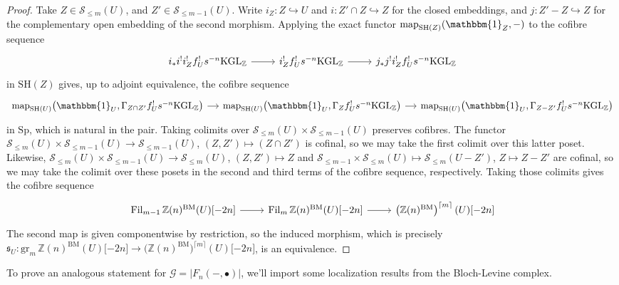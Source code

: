 \documentclass[11pt, twoside]{article}
\numberwithin{equation}{section}
\theoremstyle{definition}
\newcommand{\bb}[1]{\mathbb{#1}}
\newcommand{\mf}[1]{\mathfrak{#1}}
\newcommand{\map}{\mathrm{map}}
\newcommand{\fil}{\mathrm{Fil}}
\newcommand{\gr}{\mathrm{gr}}
\newcommand{\Kgl}{\mathrm{KGL}}
\newcommand{\sh}{\mathrm{SH}}
\newcommand{\Sp}{\mathrm{Sp}}
\newcommand{\bm}{\mathrm{BM}}
\begin{document}
\begin{proof}
Take \(Z \in \mathcal{S}_{\leq m}(U)\), and \(Z' \in \mathcal{S}_{\leq m - 1}(U)\). Write \(i_Z \colon Z \hookrightarrow U\) and \(i \colon Z' \cap Z\hookrightarrow Z\) for the closed embeddings, and \(j \colon Z' - Z \hookrightarrow Z\) for the complementary open embedding of the second morphism. Applying the exact functor \(\map_{\sh(Z)}(\mathbbm{1}_Z, -)\) to the cofibre sequence 
\[\begin{tikzcd}
i_* i^! i_Z^! f_U^! s^{- n} \Kgl_\bb{Z} \ar[r] & i_Z^! f_U^! s^{- n} \Kgl_\bb{Z} \ar[r] & j_*j^! i_Z^! f_U^! s^{- n} \Kgl_\bb{Z}
\end{tikzcd}\]
in \(\sh(Z)\) gives, up to adjoint equivalence, the cofibre sequence 
\[\begin{tikzcd} [column sep = small]
\map_{\sh(U)}\big(\mathbbm{1}_U, \Gamma_{Z \cap Z'} f_U^! s^{- n} \Kgl_\bb{Z}\big) \ar[r] & \map_{\sh(U)}\big(\mathbbm{1}_U, \Gamma_Z f_U^! s^{- n} \Kgl_\bb{Z}\big) \ar[r] & \map_{\sh(U)}\big(\mathbbm{1}_U, \Gamma_{Z - Z'} f_U^! s^{- n} \Kgl_\bb{Z}\big)
\end{tikzcd}\]
in \(\Sp\), which is natural in the pair. Taking colimits over \(\mathcal{S}_{\leq m}(U) \times \mathcal{S}_{\leq m - 1}(U)\) preserves cofibres. The functor \(\mathcal{S}_{\leq m}(U) \times \mathcal{S}_{\leq m - 1}(U) \to \mathcal{S}_{\leq m - 1}(U)\), \((Z, Z') \mapsto (Z \cap Z')\) is cofinal, so we may take the first colimit over this latter poset. Likewise, \(\mathcal{S}_{\leq m}(U) \times \mathcal{S}_{\leq m - 1}(U) \to \mathcal{S}_{\leq m}(U)\), \((Z, Z') \mapsto Z\) and \(\mathcal{S}_{\leq m - 1} \times \mathcal{S}_{\leq m}(U) \mapsto \mathcal{S}_{\leq m}(U - Z')\), \(Z \mapsto Z - Z'\) are cofinal, so we may take the colimit over these posets in the second and third terms of the cofibre sequence, respectively. Taking those colimits gives the cofibre sequence 
\[\begin{tikzcd} 
\fil_{m - 1} \, \bb{Z}(n)^\bm(U) \lbrack -2n \rbrack \ar[r] & \fil_m \, \bb{Z}(n)^\bm(U) \lbrack -2n \rbrack \ar[r] & \left(\bb{Z}(n)^\bm\right)^{\lceil m \rceil}(U)\lbrack -2n \rbrack
\end{tikzcd}\]
The second map is given componentwise by restriction, so the induced morphism, which is precisely \(\mf{s}_U \colon \gr_m \, \bb{Z}(n)^\bm(U) \lbrack -2n \rbrack \to \big(\bb{Z}(n)^\bm\big)^{\lceil m \rceil}(U)\lbrack -2n \rbrack\), is an equivalence.
\end{proof}

To prove an analogous statement for \(\mathcal{G} = |F_n( -, \bullet)|\), we'll import some localization results from the Bloch-Levine complex.
\end{document}
